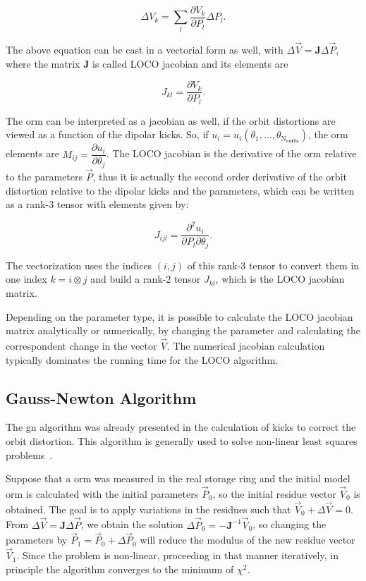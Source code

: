 \begin{equation}
\Delta V_{k} = \sum_{l}\dfrac{\partial V_{k}}{\partial P_{l}} \Delta P_{l}.
\label{eq:loco_params}
\end{equation}

The above equation can be cast in a vectorial form as well, with $\Delta \vec{V} = \mathbf{J}\Delta \vec{P}$, where the matrix $\mathbf{J}$ is called LOCO jacobian and its elements are 

\begin{equation}
    J_{kl} = \dfrac{\partial V_{k}}{\partial P_{l}}.
\end{equation}

The \gls{orm} can be interpreted as a jacobian as well, if the orbit distortions are viewed as a function of the dipolar kicks. So, if $u_i = u_i\left(\theta_1, \ldots, \theta_{\mathrm{N}_{\mathbf{corrs}}}\right)$, the \gls{orm} elements are $M_{ij} = \dfrac{\partial u_i}{\partial \theta_j}$. The LOCO jacobian is the derivative of the \gls{orm} relative to the parameters $\vec{P}$, thus it is actually the second order derivative of the orbit distortion relative to the dipolar kicks and the parameters, which can be written as a rank-3 tensor with elements given by:

\begin{equation}
    J_{ijl} = \dfrac{\partial^2 u_i}{\partial P_{l}\partial \theta_j}.
\end{equation}

The vectorization uses the indices $(i, j)$ of this rank-3 tensor to convert them in one index $k = i \otimes j$ and build a rank-2 tensor $J_{kl}$, which is the LOCO jacobian matrix.

Depending on the parameter type, it is possible to calculate the LOCO jacobian matrix analytically or numerically, by changing the parameter and calculating the correspondent change in the vector $\vec{V}$. The numerical jacobian calculation typically dominates the running time for the LOCO algorithm.

\subsection{Gauss-Newton Algorithm}

The \gls{gn} algorithm was already presented in the calculation of kicks to correct the orbit distortion. This algorithm is generally used to solve non-linear least squares problems~\cite{numerical_recipes}. 

Suppose that a \gls{orm} was measured in the real storage ring and the initial model \gls{orm} is calculated with the initial parameters $\vec{P}_0$, so the initial residue vector $\vec{V}_0$ is obtained. The goal is to apply variations in the residues such that $\vec{V}_0 + \Delta \vec{V} = 0$. From $\Delta \vec{V} = \mathbf{J}\Delta \vec{P}$, we obtain the solution $\Delta \vec{P}_0 = -\mathbf{J}^{-1} \vec{V}_0$, so changing the parameters by $\vec{P}_1 = \vec{P}_0 + \Delta \vec{P}_0$ will reduce the modulus of the new residue vector $\vec{V}_1$. Since the problem is non-linear, proceeding in that manner iteratively, in principle the algorithm converges to the minimum of $\chi^2$.

